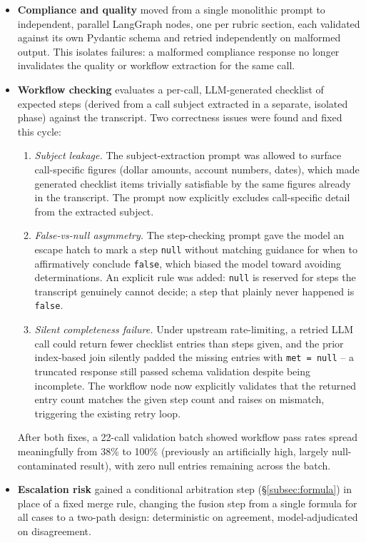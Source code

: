 \begin{itemize}
  \item \textbf{Compliance and quality} moved from a single monolithic
        prompt to independent, parallel LangGraph nodes, one per rubric
        section, each validated against its own Pydantic schema and
        retried independently on malformed output. This isolates failures:
        a malformed compliance response no longer invalidates the quality
        or workflow extraction for the same call.
  \item \textbf{Workflow checking} evaluates a per-call, LLM-generated
        checklist of expected steps (derived from a call subject
        extracted in a separate, isolated phase) against the transcript.
        Two correctness issues were found and fixed this cycle:
        \begin{enumerate}
          \item \emph{Subject leakage.} The subject-extraction prompt was
                allowed to surface call-specific figures (dollar amounts,
                account numbers, dates), which made generated checklist
                items trivially satisfiable by the same figures already
                in the transcript. The prompt now explicitly excludes
                call-specific detail from the extracted subject.
          \item \emph{False-vs-null asymmetry.} The step-checking prompt
                gave the model an escape hatch to mark a step
                \texttt{null} without matching guidance for when to
                affirmatively conclude \texttt{false}, which biased the
                model toward avoiding determinations. An explicit rule
                was added: \texttt{null} is reserved for steps the
                transcript genuinely cannot decide; a step that plainly
                never happened is \texttt{false}.
          \item \emph{Silent completeness failure.} Under upstream
                rate-limiting, a retried LLM call could return fewer
                checklist entries than steps given, and the prior
                index-based join silently padded the missing entries
                with \texttt{met = null} -- a truncated response still
                passed schema validation despite being incomplete. The
                workflow node now explicitly validates that the returned
                entry count matches the given step count and raises on
                mismatch, triggering the existing retry loop.
        \end{enumerate}
        After both fixes, a 22-call validation batch showed workflow
        pass rates spread meaningfully from 38\% to 100\% (previously an
        artificially high, largely null-contaminated result), with zero
        null entries remaining across the batch.
  \item \textbf{Escalation risk} gained a conditional arbitration step
        (\S\ref{subsec:formula}) in place of a fixed merge rule, changing
        the fusion step from a single formula for all cases to a
        two-path design: deterministic on agreement, model-adjudicated on
        disagreement.
\end{itemize}

